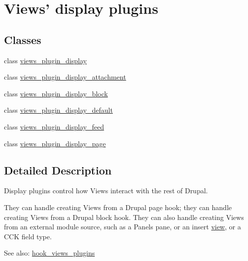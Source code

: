 \hypertarget{group__views__display__plugins}{
\section{Views' display plugins}
\label{group__views__display__plugins}
}
\subsection*{Classes}
\begin{CompactItemize}
\item 
class \hyperlink{classviews__plugin__display}{views\_\-plugin\_\-display}
\item 
class \hyperlink{classviews__plugin__display__attachment}{views\_\-plugin\_\-display\_\-attachment}
\item 
class \hyperlink{classviews__plugin__display__block}{views\_\-plugin\_\-display\_\-block}
\item 
class \hyperlink{classviews__plugin__display__default}{views\_\-plugin\_\-display\_\-default}
\item 
class \hyperlink{classviews__plugin__display__feed}{views\_\-plugin\_\-display\_\-feed}
\item 
class \hyperlink{classviews__plugin__display__page}{views\_\-plugin\_\-display\_\-page}
\end{CompactItemize}


\subsection{Detailed Description}
Display plugins control how Views interact with the rest of Drupal.

They can handle creating Views from a Drupal page hook; they can handle creating Views from a Drupal block hook. They can also handle creating Views from an external module source, such as a Panels pane, or an insert \hyperlink{classview}{view}, or a CCK field type.

\begin{Desc}
\item[See also:]\hyperlink{group__views__hooks_g23f6e9972b2ed84fc54b7ff63f44477d}{hook\_\-views\_\-plugins} \end{Desc}
